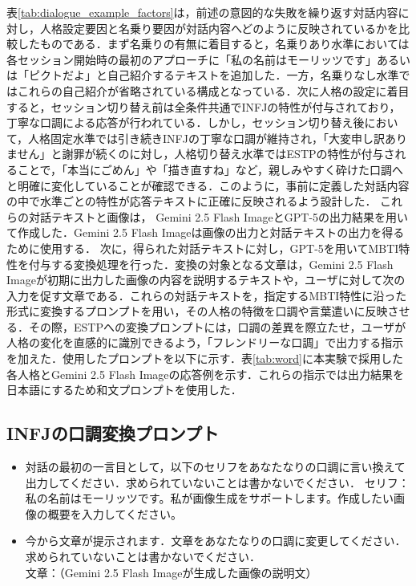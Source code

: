 \documentclass[10pt,twocolumn]{jsarticle}
\begin{document}
表\ref{tab:dialogue_example_factors}は，前述の意図的な失敗を繰り返す対話内容に対し，人格設定要因と名乗り要因が対話内容へどのように反映されているかを比較したものである．まず名乗りの有無に着目すると，名乗りあり水準においては各セッション開始時の最初のアプローチに「私の名前はモーリッツです」あるいは「ピクトだよ」と自己紹介するテキストを追加した．一方，名乗りなし水準ではこれらの自己紹介が省略されている構成となっている．次に人格の設定に着目すると，セッション切り替え前は全条件共通でINFJの特性が付与されており，丁寧な口調による応答が行われている．しかし，セッション切り替え後において，人格固定水準では引き続きINFJの丁寧な口調が維持され，「大変申し訳ありません」と謝罪が続くのに対し，人格切り替え水準ではESTPの特性が付与されることで，「本当にごめん」や「描き直すね」など，親しみやすく砕けた口調へと明確に変化していることが確認できる．このように，事前に定義した対話内容の中で水準ごとの特性が応答テキストに正確に反映されるよう設計した．
これらの対話テキストと画像は，
Gemini 2.5 Flash ImageとGPT-5の出力結果を用いて作成した．Gemini 2.5 Flash Imageは画像の出力と対話テキストの出力を得るために使用する．
次に，得られた対話テキストに対し，GPT-5を用いてMBTI特性を付与する変換処理を行った．変換の対象となる文章は，Gemini 2.5 Flash Imageが初期に出力した画像の内容を説明するテキストや，ユーザに対して次の入力を促す文章である．これらの対話テキストを，指定するMBTI特性に沿った形式に変換するプロンプトを用い，その人格の特徴を口調や言葉遣いに反映させる．その際，ESTPへの変換プロンプトには，口調の差異を際立たせ，ユーザが人格の変化を直感的に識別できるよう，「フレンドリーな口調」で出力する指示を加えた．使用したプロンプトを以下に示す．表\ref{tab:word}に本実験で採用した各人格とGemini 2.5 Flash Imageの応答例を示す．これらの指示では出力結果を日本語にするため和文プロンプトを使用した．


\subsection*{INFJの口調変換プロンプト}
\begin{itemize}
    \item 対話の最初の一言目として，以下のセリフをあなたなりの口調に言い換えて出力してください．求められていないことは書かないでください．
セリフ：私の名前はモーリッツです。私が画像生成をサポートします。作成したい画像の概要を入力してください。

    \item 今から文章が提示されます．文章をあなたなりの口調に変更してください．求められていないことは書かないでください．\\文章：（Gemini 2.5 Flash Imageが生成した画像の説明文）
\end{itemize}
\end{document}
